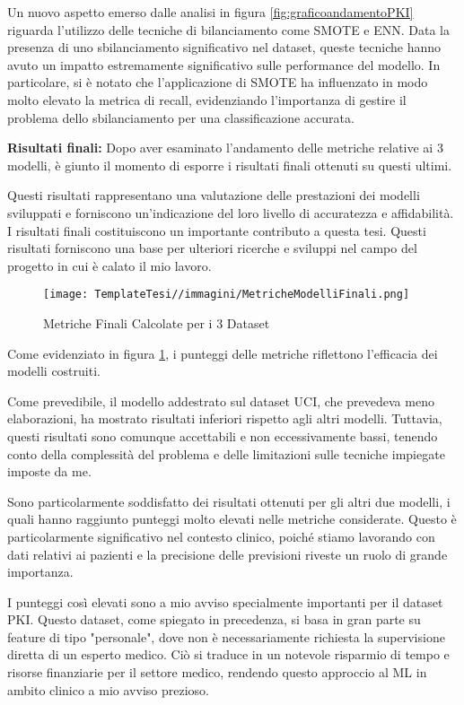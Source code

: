 \begin{flushleft}
Un nuovo aspetto emerso dalle  analisi in figura \ref{fig:graficoandamentoPKI} riguarda l'utilizzo delle tecniche di bilanciamento come SMOTE e ENN. Data la presenza di uno sbilanciamento significativo nel dataset, queste tecniche hanno avuto un impatto estremamente significativo sulle performance del modello. In particolare, si è notato che l'applicazione di SMOTE ha influenzato in modo molto elevato la metrica di recall, evidenziando l'importanza di gestire il problema dello sbilanciamento per una classificazione accurata.


\newline
\textbf{Risultati finali:}
\newline
Dopo aver esaminato l'andamento delle metriche relative ai 3 modelli, è giunto il momento di esporre i risultati finali ottenuti su questi ultimi.

Questi risultati rappresentano una valutazione delle prestazioni dei modelli sviluppati e forniscono un'indicazione del loro livello di accuratezza e affidabilità.
I risultati finali costituiscono un importante contributo a questa tesi. Questi risultati forniscono una base per ulteriori ricerche e sviluppi nel campo del progetto in cui è calato il mio lavoro.
\begin{figure}[H]
    \centering
    \texttt{[image: TemplateTesi//immagini/MetricheModelliFinali.png]}
    \caption{Metriche Finali Calcolate per i 3 Dataset}
    \label{fig:metrichefinali}
\end{figure}

Come evidenziato in figura \ref{fig:metrichefinali}, i punteggi delle metriche riflettono l'efficacia dei modelli costruiti.

Come prevedibile, il modello addestrato sul dataset UCI, che prevedeva meno elaborazioni, ha mostrato risultati inferiori rispetto agli altri modelli. Tuttavia, questi risultati sono comunque accettabili e non eccessivamente bassi, tenendo conto della complessità del problema e delle limitazioni sulle tecniche impiegate imposte da me.

Sono particolarmente soddisfatto dei risultati ottenuti per gli altri due modelli, i quali hanno raggiunto punteggi molto elevati nelle metriche considerate. Questo è particolarmente significativo nel contesto clinico, poiché stiamo lavorando con dati relativi ai pazienti e la precisione delle previsioni riveste un ruolo di grande importanza.

I punteggi così elevati sono a mio avviso specialmente importanti per il dataset PKI. Questo dataset, come spiegato in precedenza, si basa in gran parte su feature di tipo "personale", dove non è necessariamente richiesta la supervisione diretta di un esperto medico. Ciò si traduce in un notevole risparmio di tempo e risorse finanziarie per il settore medico, rendendo questo approccio al ML in ambito clinico a mio avviso prezioso.
\end{flushleft}

